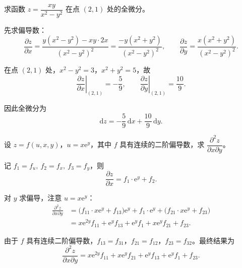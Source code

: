 \documentclass[answer]{THUExam}
\begin{document}
\begin{problem}
求函数 $z=\dfrac{xy}{x^2-y^2}$ 在点 $(2,1)$ 处的全微分。
\end{problem}
\begin{solution}
先求偏导数：
\[
\frac{\partial z}{\partial x}=\frac{y(x^2-y^2)-xy\cdot 2x}{(x^2-y^2)^2}=\frac{-y(x^2+y^2)}{(x^2-y^2)^2},\qquad
\frac{\partial z}{\partial y}=\frac{x(x^2+y^2)}{(x^2-y^2)^2}.
\]

在点 $(2,1)$ 处，$x^2-y^2=3$，$x^2+y^2=5$，故
\[
\left.\frac{\partial z}{\partial x}\right|_{(2,1)}=-\frac{5}{9},\qquad
\left.\frac{\partial z}{\partial y}\right|_{(2,1)}=\frac{10}{9}.
\]

因此全微分为
\[
\boxed{\mathrm{d}z=-\frac{5}{9}\,\mathrm{d}x+\frac{10}{9}\,\mathrm{d}y}.
\]
\end{solution}
\vspace{0.5cm}

\begin{problem}
设 $z=f(u,x,y)$，$u=x\mathrm{e}^y$，其中 $f$ 具有连续的二阶偏导数，求 $\dfrac{\partial^2 z}{\partial x\partial y}$。
\end{problem}
\begin{solution}
记 $f_1=f_u,\ f_2=f_x,\ f_3=f_y$，则
\[
\frac{\partial z}{\partial x}=f_1\cdot\mathrm{e}^y+f_2.
\]

对 $y$ 求偏导，注意 $u=x\mathrm{e}^y$：
\begin{align*}
\frac{\partial^2 z}{\partial x\partial y}
&=\bigl(f_{11}\cdot x\mathrm{e}^y+f_{13}\bigr)\mathrm{e}^y+f_1\cdot\mathrm{e}^y+\bigl(f_{21}\cdot x\mathrm{e}^y+f_{23}\bigr)\\
&=x\mathrm{e}^{2y}f_{11}+\mathrm{e}^yf_{13}+\mathrm{e}^yf_1+x\mathrm{e}^yf_{21}+f_{23}.
\end{align*}

由于 $f$ 具有连续二阶偏导数，$f_{13}=f_{31}$，$f_{21}=f_{12}$，$f_{23}=f_{32}$。最终结果为
\[
\boxed{\frac{\partial^2 z}{\partial x\partial y}=x\mathrm{e}^{2y}f_{11}+x\mathrm{e}^yf_{21}+\mathrm{e}^yf_{13}+\mathrm{e}^yf_1+f_{23}}.
\]
\end{solution}
\vspace{0.5cm}
\end{document}
